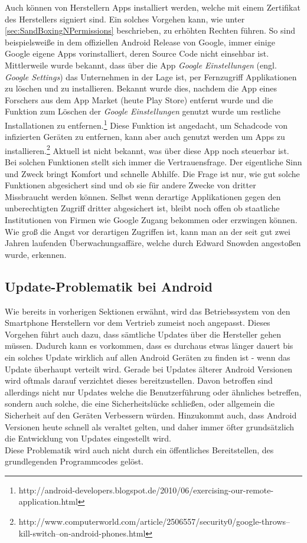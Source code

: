 Auch können von Herstellern Apps installiert werden, welche mit einem Zertifikat des Herstellers signiert sind. Ein solches Vorgehen kann, wie unter \ref*{sec:SandBoxingNPermissions} beschrieben, zu erhöhten Rechten führen.
So sind beispielsweiße in dem offiziellen Android Release von Google, immer einige Google eigene Apps vorinstalliert, deren Source Code nicht einsehbar ist. Mittlerweile wurde bekannt, dass über die App \textit{Google Einstellungen} (engl. \textit{Google Settings}) das Unternehmen in der Lage ist, per Fernzugriff Applikationen zu löschen und zu installieren. Bekannt wurde dies, nachdem die App eines Forschers aus dem App Market (heute Play Store) entfernt wurde und die Funktion zum Löschen der \textit{Google Einstellungen} genutzt wurde um restliche Installationen zu entfernen.\footnote{http://android-developers.blogspot.de/2010/06/exercising-our-remote-application.html} 
Diese Funktion ist angedacht, um Schadcode von infizierten Geräten zu entfernen, kann aber auch genutzt werden um Apps zu installieren.\footnote{http://www.computerworld.com/article/2506557/security0/google-throws--kill-switch--on-android-phones.html} Aktuell ist nicht bekannt, was über diese App noch steuerbar ist.\\
Bei solchen Funktionen stellt sich immer die Vertrauensfrage. Der eigentliche Sinn und Zweck bringt Komfort und schnelle Abhilfe. Die Frage ist nur, wie gut solche Funktionen abgesichert sind und ob sie für andere Zwecke von dritter Missbraucht werden können. Selbst wenn derartige Applikationen gegen den unberechtigten Zugriff dritter abgesichert ist, bleibt noch offen ob staatliche Institutionen von Firmen wie Google Zugang bekommen oder erzwingen können. Wie groß die Angst vor derartigen Zugriffen ist, kann man an der seit gut zwei Jahren laufenden Überwachungsaffäre, welche durch Edward Snowden angestoßen wurde, erkennen.

\subsection{Update-Problematik bei Android}
Wie bereits in vorherigen Sektionen erwähnt, wird das Betriebssystem von den Smartphone Herstellern vor dem Vertrieb zumeist noch angepasst. Dieses Vorgehen führt auch dazu, dass sämtliche Updates über die Hersteller gehen müssen. Dadurch kann es vorkommen, dass es durchaus etwas länger dauert bis ein solches Update wirklich auf allen Android Geräten zu finden ist - wenn das Update überhaupt verteilt wird. Gerade bei Updates älterer Android Versionen wird oftmals darauf verzichtet dieses bereitzustellen. Davon betroffen sind allerdings nicht nur Updates welche die Benutzerführung oder ähnliches betreffen, sondern auch solche, die eine Sicherheitslücke schließen, oder allgemein die Sicherheit auf den Geräten Verbessern würden. Hinzukommt auch, dass Android Versionen heute schnell als veraltet gelten, und daher immer öfter grundsätzlich die Entwicklung von Updates eingestellt wird.\\
Diese Problematik wird auch nicht durch ein öffentliches Bereitstellen, des grundlegenden Programmcodes gelöst.